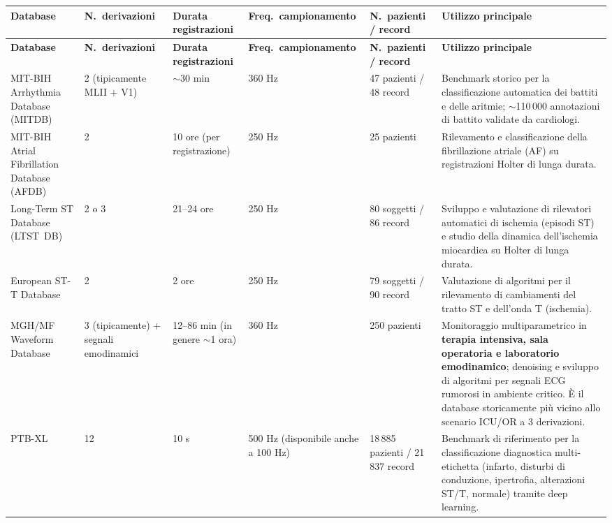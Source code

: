 \documentclass[11pt,a4paper]{article}
\begin{document}
\begin{longtable}{P{3.2cm}P{1.6cm}P{2.0cm}P{1.6cm}P{1.6cm}P{5.5cm}}
\toprule
\textbf{Database} & \textbf{N.\ derivazioni} & \textbf{Durata registrazioni} & \textbf{Freq.\ campionamento} & \textbf{N.\ pazienti / record} & \textbf{Utilizzo principale} \\
\midrule
\endfirsthead
\toprule
\textbf{Database} & \textbf{N.\ derivazioni} & \textbf{Durata registrazioni} & \textbf{Freq.\ campionamento} & \textbf{N.\ pazienti / record} & \textbf{Utilizzo principale} \\
\midrule
\endhead

MIT-BIH Arrhythmia Database (MITDB) &
2 (tipicamente MLII + V1) &
$\sim$30 min &
360 Hz &
47 pazienti / 48 record &
Benchmark storico per la classificazione automatica dei battiti e delle aritmie; $\sim$110\,000 annotazioni di battito validate da cardiologi. \\
\midrule

MIT-BIH Atrial Fibrillation Database (AFDB) &
2 &
10 ore (per registrazione) &
250 Hz &
25 pazienti &
Rilevamento e classificazione della fibrillazione atriale (AF) su registrazioni Holter di lunga durata. \\
\midrule

Long-Term ST Database (LTST~DB) &
2 o 3 &
21--24 ore &
250 Hz &
80 soggetti / 86 record &
Sviluppo e valutazione di rilevatori automatici di ischemia (episodi ST) e studio della dinamica dell'ischemia miocardica su Holter di lunga durata. \\
\midrule

European ST-T Database &
2 &
2 ore &
250 Hz &
79 soggetti / 90 record &
Valutazione di algoritmi per il rilevamento di cambiamenti del tratto ST e dell'onda T (ischemia). \\
\midrule

MGH/MF Waveform Database &
3 (tipicamente) + segnali emodinamici &
12--86 min (in genere $\sim$1 ora) &
360 Hz &
250 pazienti &
Monitoraggio multiparametrico in \textbf{terapia intensiva, sala operatoria e laboratorio emodinamico}; denoising e sviluppo di algoritmi per segnali ECG rumorosi in ambiente critico. \`E il database storicamente più vicino allo scenario ICU/OR a 3 derivazioni. \\
\midrule

PTB-XL &
12 &
10 s &
500 Hz (disponibile anche a 100 Hz) &
18\,885 pazienti / 21\,837 record &
Benchmark di riferimento per la classificazione diagnostica multi-etichetta (infarto, disturbi di conduzione, ipertrofia, alterazioni ST/T, normale) tramite deep learning. \\
\midrule


\end{longtable}
\end{document}
